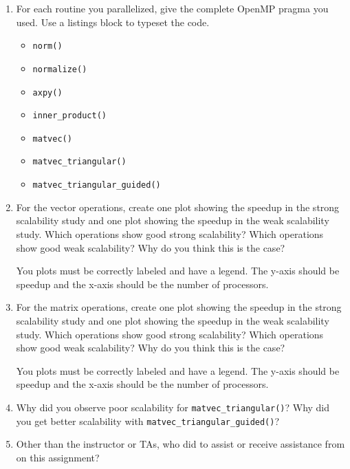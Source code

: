\documentclass[letter]{article}
\begin{document}
    \begin{enumerate}
        \item For each routine you parallelized, give the complete OpenMP pragma you used.  Use a listings block to typeset the code.
            \begin{itemize}
                \item \texttt{norm()}
                \item \texttt{normalize()}
                \item \texttt{axpy()}
                \item \texttt{inner\_product()}
                \item \texttt{matvec()}
                \item \texttt{matvec\_triangular()}
                \item \texttt{matvec\_triangular\_guided()}
            \end{itemize}

        \item For the vector operations, create one plot showing the speedup in the strong scalability study and one plot showing the speedup in the weak scalability study.  Which operations show good strong scalability?  Which operations show good weak scalability?  Why do you think this is the case?

        You plots must be correctly labeled and have a legend.  The y-axis should be speedup and the x-axis should be the number of processors.

        \item For the matrix operations, create one plot showing the speedup in the strong scalability study and one plot showing the speedup in the weak scalability study.  Which operations show good strong scalability?  Which operations show good weak scalability?  Why do you think this is the case?

        You plots must be correctly labeled and have a legend.  The y-axis should be speedup and the x-axis should be the number of processors.

        \item Why did you observe poor scalability for \texttt{matvec\_triangular()}?  Why did you get better scalability with \texttt{matvec\_triangular\_guided()}?
        
        \item Other than the instructor or TAs, who did to assist or receive assistance from on this assignment?

    \end{enumerate}
\end{document}
